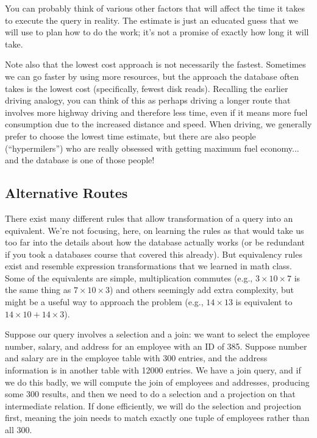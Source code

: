 \documentclass[a4paper]{report}
\begin{document}
You can probably think of various other factors that will affect the time it takes to execute the query in reality. The estimate is just an educated guess that we will use to plan how to do the work; it's not a promise of exactly how long it will take.

Note also that the lowest cost approach is not necessarily the fastest. Sometimes we can go faster by using more resources, but the approach the database often takes is the lowest cost (specifically, fewest disk reads). Recalling the earlier driving analogy, you can think of this as perhaps driving a longer route that involves more highway driving and therefore less time, even if it means more fuel consumption due to the increased distance and speed. When driving, we generally prefer to choose the lowest time estimate, but there are also people (``hypermilers'') who are really obsessed with getting maximum fuel economy... and the database is one of those people!

\subsection*{Alternative Routes}
There exist many different rules that allow transformation of a query into an equivalent. We're not focusing, here, on learning the rules as that would take us too far into the details about how the database actually works (or be redundant if you took a databases course that covered this already). But equivalency rules exist and resemble expression transformations that we learned in math class. Some of the equivalents are simple, multiplication commutes (e.g., $3 \times 10 \times 7$ is the same thing as $7 
\times 10 \times 3$) and others seemingly add extra complexity, but might be a useful way to approach the problem (e.g., $14 \times 13$ is equivalent to $14 \times 10 + 14 \times 3$). 

Suppose our query involves a selection and a join: we want to select the employee number, salary, and address for an employee with an ID of 385. Suppose number and salary are in the employee table with 300 entries, and the address information is in another table with 12000 entries. We have a join query, and if we do this badly, we will compute the join of employees and addresses, producing some 300 results, and then we need to do a selection and a projection on that intermediate relation. If done efficiently, we will do the selection and projection first, meaning the join needs to match exactly one tuple of employees rather than all 300. 
\end{document}
